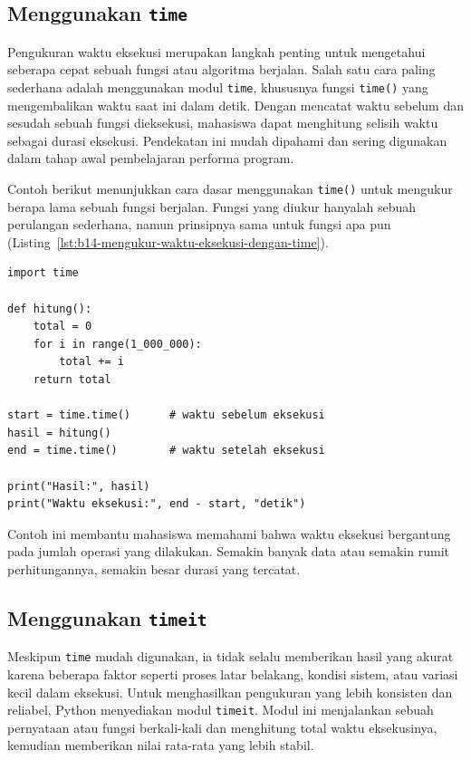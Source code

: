 \subsection{Menggunakan \texttt{time}}

Pengukuran waktu eksekusi merupakan langkah penting untuk mengetahui seberapa cepat sebuah fungsi atau algoritma berjalan. Salah satu cara paling sederhana adalah menggunakan modul \texttt{time}, khususnya fungsi \texttt{time()} yang mengembalikan waktu saat ini dalam detik. Dengan mencatat waktu sebelum dan sesudah sebuah fungsi dieksekusi, mahasiswa dapat menghitung selisih waktu sebagai durasi eksekusi. Pendekatan ini mudah dipahami dan sering digunakan dalam tahap awal pembelajaran performa program.

Contoh berikut menunjukkan cara dasar menggunakan \texttt{time()} untuk mengukur berapa lama sebuah fungsi berjalan. Fungsi yang diukur hanyalah sebuah perulangan sederhana, namun prinsipnya sama untuk fungsi apa pun (Listing~\ref{lst:b14-mengukur-waktu-eksekusi-dengan-time}).

\begin{lstlisting}[style=PythonStyle, caption={Mengukur waktu eksekusi dengan time}, label={lst:b14-mengukur-waktu-eksekusi-dengan-time}]
import time

def hitung():
    total = 0
    for i in range(1_000_000):
        total += i
    return total

start = time.time()      # waktu sebelum eksekusi
hasil = hitung()
end = time.time()        # waktu setelah eksekusi

print("Hasil:", hasil)
print("Waktu eksekusi:", end - start, "detik")
\end{lstlisting}

Contoh ini membantu mahasiswa memahami bahwa waktu eksekusi bergantung pada jumlah operasi yang dilakukan. Semakin banyak data atau semakin rumit perhitungannya, semakin besar durasi yang tercatat.

\subsection{Menggunakan \texttt{timeit}}

Meskipun \texttt{time} mudah digunakan, ia tidak selalu memberikan hasil yang akurat karena beberapa faktor seperti proses latar belakang, kondisi sistem, atau variasi kecil dalam eksekusi. Untuk menghasilkan pengukuran yang lebih konsisten dan reliabel, Python menyediakan modul \texttt{timeit}. Modul ini menjalankan sebuah pernyataan atau fungsi berkali-kali dan menghitung total waktu eksekusinya, kemudian memberikan nilai rata-rata yang lebih stabil.

